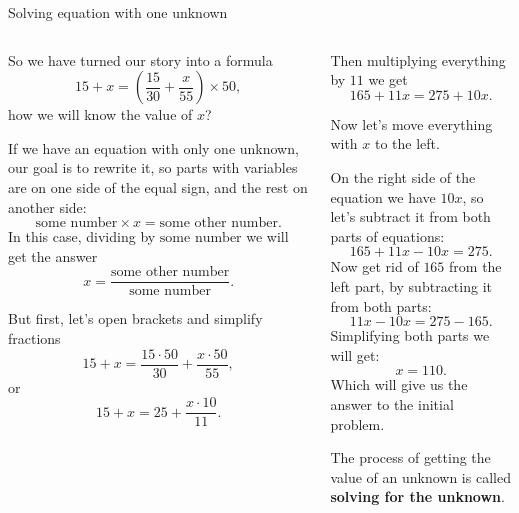 \documentclass[9pt,aspectratio=169]{beamer}
\begin{document}
\begin{frame}{Solving equation with one unknown}
  \begin{columns}[T]
    \begin{column}{0.5\textwidth}
      So we have turned our story into a formula
      \[ 15 + x = \left(\frac{15}{30} + \frac{x}{55}\right) \times 50, \]
      how we will know the value of $x$?

      If we have an equation with only one unknown, our goal is to rewrite it, so parts with variables are on one side of the equal sign, and the rest on another side:
      \[ \text{some number} \times x = \text{some other number}. \]
      In this case, dividing by $\text{some number}$ we will get the answer
      \[ x = \frac{\text{some other number}}{\text{some number}}. \]

      But first, let's open brackets and simplify fractions
      \[ 15 + x = \frac{15 \cdot 50}{30} + \frac{x \cdot 50}{55}, \] or 
      \[ 15 + x = 25 + \frac{x \cdot 10}{11}. \]
    \end{column}
    \begin{column}{0.5\textwidth}
      Then multiplying everything by $11$ we get
      \[ 165 + 11x = 275 + 10x. \]

      Now let's move everything with $x$ to the left.

      On the right side of the equation we have $10x$, so let's subtract it from both parts of equations:
      \[ 165 + 11x - 10x = 275. \]
      Now get rid of $165$ from the left part, by subtracting it from both parts:
      \[ 11x - 10x = 275 - 165. \]
      Simplifying both parts we will get:
      \[ x = 110. \]
      Which will give us the answer to the initial problem.
      \begin{definition}
        The process of getting the value of an unknown is called \textbf{solving for the unknown}.
      \end{definition}
    \end{column}
  \end{columns}
\end{frame}
\end{document}
